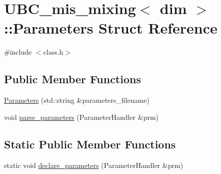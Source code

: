 \hypertarget{struct_u_b_c__mis__mixing_1_1_parameters}{}\section{U\+B\+C\+\_\+mis\+\_\+mixing$<$ dim $>$\+:\+:Parameters Struct Reference}
\label{struct_u_b_c__mis__mixing_1_1_parameters}


{\ttfamily \#include $<$class.\+h$>$}

\subsection*{Public Member Functions}
\begin{DoxyCompactItemize}
\item 
\hyperlink{struct_u_b_c__mis__mixing_1_1_parameters_ad12e7c5f85bb4262a8713b9dbe250e32}{Parameters} (std\+::string \&parameters\+\_\+filename)
\item 
void \hyperlink{struct_u_b_c__mis__mixing_1_1_parameters_a09e79bcb48f2452c0228415b80fcd2a4}{parse\+\_\+parameters} (Parameter\+Handler \&prm)
\end{DoxyCompactItemize}
\subsection*{Static Public Member Functions}
\begin{DoxyCompactItemize}
\item 
static void \hyperlink{struct_u_b_c__mis__mixing_1_1_parameters_afe2e7d873f6f2670ae14f405aeaa67f1}{declare\+\_\+parameters} (Parameter\+Handler \&prm)
\end{DoxyCompactItemize}
